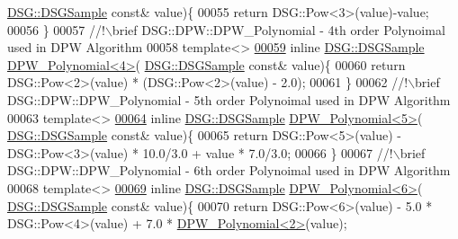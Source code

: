 \begin{DoxyCode}
      \hyperlink{namespace_d_s_g_ac39a94cd27ebcd9c1e7502d0c624894a}{DSG::DSGSample} \textcolor{keyword}{const}& value)\{
00055             \textcolor{keywordflow}{return} DSG::Pow<3>(value)-value;
00056         \}\textcolor{comment}{}
00057 \textcolor{comment}{        //!\(\backslash\)brief DSG::DPW::DPW\_Polynomial - 4th order Polynoimal used in DPW Algorithm}
00058 \textcolor{comment}{}        \textcolor{keyword}{template}<>
\hypertarget{_d_p_w_8h_source_l00059}{}\hyperlink{namespace_d_s_g_1_1_d_p_w_a56e019e6b80abdc8d0d9d63e69b65da0}{00059}         \textcolor{keyword}{inline} \hyperlink{namespace_d_s_g_ac39a94cd27ebcd9c1e7502d0c624894a}{DSG::DSGSample} \hyperlink{namespace_d_s_g_1_1_d_p_w_a56e019e6b80abdc8d0d9d63e69b65da0}{DPW\_Polynomial<4>}(
      \hyperlink{namespace_d_s_g_ac39a94cd27ebcd9c1e7502d0c624894a}{DSG::DSGSample} \textcolor{keyword}{const}& value)\{
00060             \textcolor{keywordflow}{return} DSG::Pow<2>(value) * (DSG::Pow<2>(value) - 2.0);
00061         \}\textcolor{comment}{}
00062 \textcolor{comment}{        //!\(\backslash\)brief DSG::DPW::DPW\_Polynomial - 5th order Polynoimal used in DPW Algorithm}
00063 \textcolor{comment}{}        \textcolor{keyword}{template}<>
\hypertarget{_d_p_w_8h_source_l00064}{}\hyperlink{namespace_d_s_g_1_1_d_p_w_a1b04cfea475babd2006c84ba118c1909}{00064}         \textcolor{keyword}{inline} \hyperlink{namespace_d_s_g_ac39a94cd27ebcd9c1e7502d0c624894a}{DSG::DSGSample} \hyperlink{namespace_d_s_g_1_1_d_p_w_a1b04cfea475babd2006c84ba118c1909}{DPW\_Polynomial<5>}(
      \hyperlink{namespace_d_s_g_ac39a94cd27ebcd9c1e7502d0c624894a}{DSG::DSGSample} \textcolor{keyword}{const}& value)\{
00065             \textcolor{keywordflow}{return} DSG::Pow<5>(value) - DSG::Pow<3>(value) * 10.0/3.0 + value * 7.0/3.0;
00066         \}\textcolor{comment}{}
00067 \textcolor{comment}{        //!\(\backslash\)brief DSG::DPW::DPW\_Polynomial - 6th order Polynoimal used in DPW Algorithm}
00068 \textcolor{comment}{}        \textcolor{keyword}{template}<>
\hypertarget{_d_p_w_8h_source_l00069}{}\hyperlink{namespace_d_s_g_1_1_d_p_w_a0c0f87dd5176cd98f69c5ec46db50369}{00069}         \textcolor{keyword}{inline} \hyperlink{namespace_d_s_g_ac39a94cd27ebcd9c1e7502d0c624894a}{DSG::DSGSample} \hyperlink{namespace_d_s_g_1_1_d_p_w_a0c0f87dd5176cd98f69c5ec46db50369}{DPW\_Polynomial<6>}(
      \hyperlink{namespace_d_s_g_ac39a94cd27ebcd9c1e7502d0c624894a}{DSG::DSGSample} \textcolor{keyword}{const}& value)\{
00070             \textcolor{keywordflow}{return} DSG::Pow<6>(value) - 5.0 * DSG::Pow<4>(value) + 7.0 * 
      \hyperlink{namespace_d_s_g_1_1_d_p_w_a140753401d8518aa64bbcd7496a65b45}{DPW\_Polynomial<2>}(value);

\end{DoxyCode}
